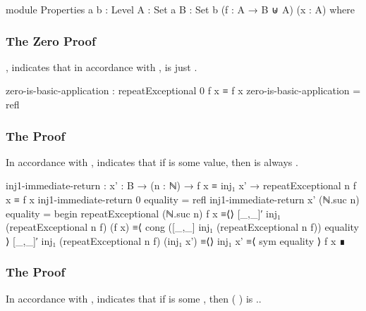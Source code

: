 \documentclass{report}
\begin{document}
\begin{code}
  module Properties
    {a b : Level}
    {A : Set a}
    {B : Set b}
    (f : A → B ⊎ A)
    (x : A) where
\end{code}

\subsubsection{The Zero Proof}
, indicates that in accordance with ,     is just  .

\begin{code}
    zero-is-basic-application : repeatExceptional 0 f x ≡ f x
    zero-is-basic-application = refl
\end{code}

\subsubsection{The  Proof}
In accordance with ,  indicates that if   is some  value, then     is always  .

\begin{code}
    inj1-immediate-return :
      {x' : B} →
      (n : ℕ) →
      f x ≡ inj₁ x' →
      repeatExceptional n f x ≡ f x
    inj1-immediate-return 0 equality = refl
    inj1-immediate-return {x'} (ℕ.suc n) equality = begin
      repeatExceptional (ℕ.suc n) f x
        ≡⟨⟩
      [_,_]′ inj₁ (repeatExceptional n f) (f x)
        ≡⟨ cong ([_,_] inj₁ (repeatExceptional n f)) equality ⟩
      [_,_]′ inj₁ (repeatExceptional n f) (inj₁ x')
        ≡⟨⟩
      inj₁ x'
        ≡⟨ sym equality ⟩
      f x ∎
\end{code}

\subsubsection{The  Proof}
In accordance with ,  indicates that if   is some  , then  \AgdaSymbol( \AgdaSymbol)   is    ..
\end{document}
